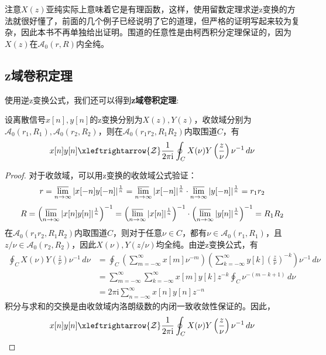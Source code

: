 注意$X(z)$亚纯实际上意味着它是有理函数，这样，使用留数定理求逆z变换的方法就很好懂了，前面的几个例子已经说明了它的道理，但严格的证明写起来较为复杂，因此本书不再单独给出证明。围道的任意性是由柯西积分定理保证的，因为$X(z)$在$\mathcal{A} _0(r,R)$内全纯。

\subsection{z域卷积定理}\label{sub:z_convolution}

使用逆z变换公式，我们还可以得到\textbf{z域卷积定理}:
\begin{theorem}[z域卷积定理]
    设离散信号$x[n],y[n]$的z变换分别为$X(z),Y(z)$，收敛域分别为$\mathcal{A} _0(r_1,R_1),\mathcal{A} _0(r_2,R_2)$，则在$\mathcal{A} _0(r_1 r_2,R_1 R_2)$内取围道$C$，有
    \[x[n]y[n]\xleftrightarrow{\mathcal{Z}} \frac{1}{2\pi \mathrm{i}}\oint_{C}X(\nu)Y\left(\frac{z}{\nu}\right)\nu^{-1}\,d\nu\]
\end{theorem}
\begin{proof}
    对于收敛域，可以用z变换的收敛域公式验证：
    \[r=\varlimsup_{n\to\infty}|x[-n]y[-n]|^{\frac{1}{n}}=\varlimsup_{n\to\infty}|x[-n]|^{\frac{1}{n}}\cdot\varlimsup_{n\to\infty}|y[-n]|^{\frac{1}{n}}=r_1 r_2\]
    \[R=\left(\varlimsup_{n\to\infty}|x[n]y[n]|^{\frac{1}{n}}\right)^{-1}=\left(\varlimsup_{n\to\infty}|x[n]|^{\frac{1}{n}}\right)^{-1}\cdot\left(\varlimsup_{n\to\infty}|y[n]|^{\frac{1}{n}}\right)^{-1}=R_1 R_2\]
    在$\mathcal{A} _0(r_1 r_2,R_1 R_2)$内取围道$C$，则对于任意$\nu\in C$，都有$\nu\in\mathcal{A} _0(r_1,R_1)$，且$z/\nu\in\mathcal{A} _0(r_2,R_2)$，因此$X(\nu),Y(z/\nu)$均全纯。由逆z变换公式，有
    \begin{align*}
        \oint_{C}X(\nu)Y\left(\frac{z}{\nu}\right)\nu^{-1}\,d\nu&=\oint_{C}\left(\sum_{m=-\infty}^{\infty}x[m]\nu^{-m}\right)\left(\sum_{k=-\infty}^{\infty}y[k]\left(\frac{z}{\nu}\right)^{-k}\right)\nu^{-1}\,d\nu\\
        &=\sum_{m=-\infty}^{\infty}\sum_{k=-\infty}^{\infty}x[m]y[k]z^{-k}\oint_{C}\nu^{-(m-k+1)}\,d\nu\\
        &=2\pi \mathrm{i} \sum_{n=-\infty}^{\infty}x[n]y[n]z^{-n}
    \end{align*}
    积分与求和的交换是由收敛域内洛朗级数的内闭一致收敛性保证的。因此，
    \[x[n]y[n]\xleftrightarrow{\mathcal{Z}} \frac{1}{2\pi \mathrm{i}}\oint_{C}X(\nu)Y\left(\frac{z}{\nu}\right)\nu^{-1}\,d\nu\]
\end{proof}

